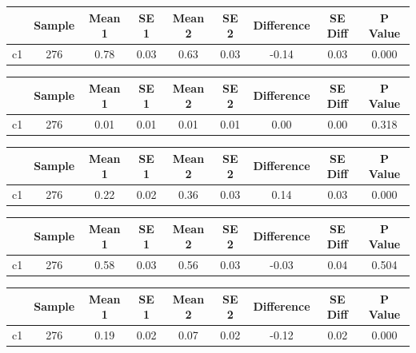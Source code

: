 {
\def\sym#1{\ifmmode^{#1}\else\(^{#1}\)\fi}
\begin{tabular}{l*{1}{cccccccc}}
\hline\hline
            &      Sample&      Mean 1&        SE 1&      Mean 2&        SE 2&  Difference&     SE Diff&     P Value\\
\hline
c1          &         276&        0.78&        0.03&        0.63&        0.03&       -0.14&        0.03&       0.000\\
\hline\hline
\end{tabular}
}
{
\def\sym#1{\ifmmode^{#1}\else\(^{#1}\)\fi}
\begin{tabular}{l*{1}{cccccccc}}
\hline\hline
            &      Sample&      Mean 1&        SE 1&      Mean 2&        SE 2&  Difference&     SE Diff&     P Value\\
\hline
c1          &         276&        0.01&        0.01&        0.01&        0.01&        0.00&        0.00&       0.318\\
\hline\hline
\end{tabular}
}
{
\def\sym#1{\ifmmode^{#1}\else\(^{#1}\)\fi}
\begin{tabular}{l*{1}{cccccccc}}
\hline\hline
            &      Sample&      Mean 1&        SE 1&      Mean 2&        SE 2&  Difference&     SE Diff&     P Value\\
\hline
c1          &         276&        0.22&        0.02&        0.36&        0.03&        0.14&        0.03&       0.000\\
\hline\hline
\end{tabular}
}
{
\def\sym#1{\ifmmode^{#1}\else\(^{#1}\)\fi}
\begin{tabular}{l*{1}{cccccccc}}
\hline\hline
            &      Sample&      Mean 1&        SE 1&      Mean 2&        SE 2&  Difference&     SE Diff&     P Value\\
\hline
c1          &         276&        0.58&        0.03&        0.56&        0.03&       -0.03&        0.04&       0.504\\
\hline\hline
\end{tabular}
}
{
\def\sym#1{\ifmmode^{#1}\else\(^{#1}\)\fi}
\begin{tabular}{l*{1}{cccccccc}}
\hline\hline
            &      Sample&      Mean 1&        SE 1&      Mean 2&        SE 2&  Difference&     SE Diff&     P Value\\
\hline
c1          &         276&        0.19&        0.02&        0.07&        0.02&       -0.12&        0.02&       0.000\\
\hline\hline
\end{tabular}
}
